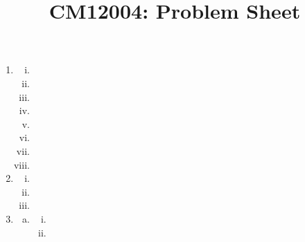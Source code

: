\documentclass{article}
\title{CM12004: Problem Sheet}
\author{} %
\date{} %
\begin{document}
\maketitle

\begin{enumerate}
  \item
  \begin{enumerate}[(i)]
    \item %

    \item %

    \item %

    \item %

    \item %

    \item %

    \item %

    \item %

  \end{enumerate}

  \item
  \begin{enumerate}[(i)]
    \item %

    \item %

    \item %

  \end{enumerate}

  \item
  \begin{enumerate}[(a)]
    \item %
    \begin{enumerate}[(i)]
      \item %

      \item %


\end{enumerate}
\end{enumerate}
\end{enumerate}
\end{document}

